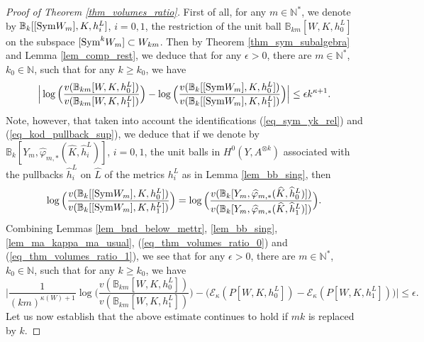 \documentclass[12pt]{article}
\numberwithin{equation}{section}
\theoremstyle{theorem}
\theoremstyle{definition}
\theoremstyle{remark}
\newcommand{\vol}{v}
\newcommand{\nat}{\mathbb{N}}
\begin{document}
	\begin{proof}[Proof of Theorem \ref{thm_volumes_ratio}]
		First of all, for any $m \in \nat^*$, we denote by $\mathbb{B}_k[[{\rm{Sym}} W_m], K, h^L_i]$, $i = 0, 1$, the restriction of the unit ball $\mathbb{B}_{km}[W, K, h^L_0]$ on the subspace $[{\rm{Sym}}^k W_m] \subset W_{km}$.
		Then by Theorem \ref{thm_sym_subalgebra} and Lemma \ref{lem_comp_rest}, we deduce that for any $\epsilon > 0$, there are $m \in \nat^*$, $k_0 \in \nat$, such that for any $k \geq k_0$, we have
		\begin{equation}\label{eq_thm_volumes_ratio_0}
			\Big|
			\log\Big(
			\frac{\vol(\mathbb{B}_{km}[W, K, h^L_0])}{\vol(\mathbb{B}_{km}[W, K, h^L_1])}
			\Big)
			-
			\log\Big(
			\frac{\vol(\mathbb{B}_k[[{\rm{Sym}} W_m], K, h^L_0])}{\vol(\mathbb{B}_k[[{\rm{Sym}} W_m], K, h^L_1])}
			\Big)
			\Big|
			\leq
			\epsilon k^{\kappa + 1}.
		\end{equation}
		Note, however, that taken into account the identifications (\ref{eq_sym_yk_rel}) and (\ref{eq_kod_pullback_sup}), we deduce that if we denote by $\mathbb{B}_k[Y_m, \widehat{\varphi}_{m, *} (\widehat{K}, \widehat{h}^L_i)]$, $i = 0, 1$, the unit balls in $H^0(Y, A^{\otimes k})$ associated with the pullbacks $\widehat{h}^L_i$ on $\widehat{L}$ of the metrics $h^L_i$ as in Lemma \ref{lem_bb_sing}, then
		\begin{equation}\label{eq_thm_volumes_ratio_1}
			\log\Big(\frac{\vol(\mathbb{B}_k[[{\rm{Sym}} W_m], K, h^L_0])}{\vol(\mathbb{B}_k[[{\rm{Sym}} W_m], K, h^L_1])}\Big)
			=
			\log\Big(
			\frac{\vol(\mathbb{B}_k[Y_m, \widehat{\varphi}_{m, *} (\widehat{K}, \widehat{h}^L_0)])}{\vol(\mathbb{B}_k[Y_m, \widehat{\varphi}_{m, *} (\widehat{K}, \widehat{h}^L_1)])}
			\Big).
		\end{equation}
		Combining Lemmas \ref{lem_bnd_below_mettr}, \ref{lem_bb_sing}, \ref{lem_ma_kappa_ma_usual}, (\ref{eq_thm_volumes_ratio_0}) and (\ref{eq_thm_volumes_ratio_1}), we see that for any $\epsilon > 0$, there are $m \in \nat^*$, $k_0 \in \nat$, such that for any $k \geq k_0$, we have
		\begin{equation}\label{eq_thm_volumes_ratio_1000}
			\Big|
			\frac{1}{(km)^{\kappa(W) + 1}}
			\log\Big(\frac{\vol(\mathbb{B}_{km}[W, K, h^L_0])}{\vol(\mathbb{B}_{km}[W, K, h^L_1])}
			\Big)
			-
			\big(
			\mathscr{E}_{\kappa}(P[W, K, h^L_0]) - \mathscr{E}_{\kappa}(P[W, K, h^L_1])
			\big)
			\Big|
			\leq
			\epsilon.
		\end{equation}
		Let us now establish that the above estimate continues to hold if $mk$ is replaced by $k$.

\end{proof}
\end{document}
